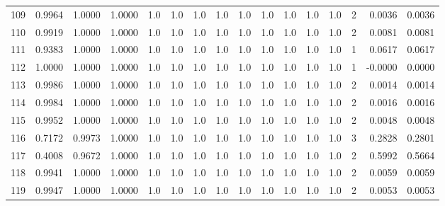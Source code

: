 \begin{tabular}{lrrrrrrrrrrrrrrr}
109 &      0.9964 &  1.0000 &  1.0000 &     1.0 &     1.0 &     1.0 &     1.0 &     1.0 &     1.0 &     1.0 &      1.0 &        1.0 &      2 &                    0.0036 &                     0.0036 \\
110 &      0.9919 &  1.0000 &  1.0000 &     1.0 &     1.0 &     1.0 &     1.0 &     1.0 &     1.0 &     1.0 &      1.0 &        1.0 &      2 &                    0.0081 &                     0.0081 \\
111 &      0.9383 &  1.0000 &  1.0000 &     1.0 &     1.0 &     1.0 &     1.0 &     1.0 &     1.0 &     1.0 &      1.0 &        1.0 &      1 &                    0.0617 &                     0.0617 \\
112 &      1.0000 &  1.0000 &  1.0000 &     1.0 &     1.0 &     1.0 &     1.0 &     1.0 &     1.0 &     1.0 &      1.0 &        1.0 &      1 &                   -0.0000 &                     0.0000 \\
113 &      0.9986 &  1.0000 &  1.0000 &     1.0 &     1.0 &     1.0 &     1.0 &     1.0 &     1.0 &     1.0 &      1.0 &        1.0 &      2 &                    0.0014 &                     0.0014 \\
114 &      0.9984 &  1.0000 &  1.0000 &     1.0 &     1.0 &     1.0 &     1.0 &     1.0 &     1.0 &     1.0 &      1.0 &        1.0 &      2 &                    0.0016 &                     0.0016 \\
115 &      0.9952 &  1.0000 &  1.0000 &     1.0 &     1.0 &     1.0 &     1.0 &     1.0 &     1.0 &     1.0 &      1.0 &        1.0 &      2 &                    0.0048 &                     0.0048 \\
116 &      0.7172 &  0.9973 &  1.0000 &     1.0 &     1.0 &     1.0 &     1.0 &     1.0 &     1.0 &     1.0 &      1.0 &        1.0 &      3 &                    0.2828 &                     0.2801 \\
117 &      0.4008 &  0.9672 &  1.0000 &     1.0 &     1.0 &     1.0 &     1.0 &     1.0 &     1.0 &     1.0 &      1.0 &        1.0 &      2 &                    0.5992 &                     0.5664 \\
118 &      0.9941 &  1.0000 &  1.0000 &     1.0 &     1.0 &     1.0 &     1.0 &     1.0 &     1.0 &     1.0 &      1.0 &        1.0 &      2 &                    0.0059 &                     0.0059 \\
119 &      0.9947 &  1.0000 &  1.0000 &     1.0 &     1.0 &     1.0 &     1.0 &     1.0 &     1.0 &     1.0 &      1.0 &        1.0 &      2 &                    0.0053 &                     0.0053 \\

\end{tabular}
